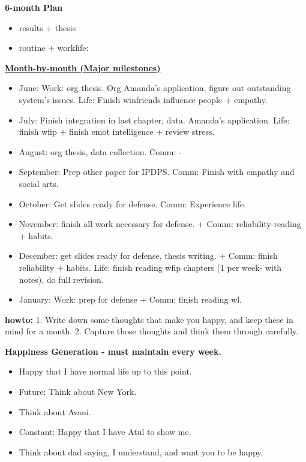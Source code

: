 \documentclass[11pt]{article}
\begin{document}
\textbf{6-month Plan} 
\begin{itemize} 
  \tiny \item \tiny results + thesis
\item \tiny routine + worklife:
\end{itemize}
\newpage
    {\small \underline{\textbf{Month-by-month (Major milestones)}}}\\ 
    \begin{itemize}
      \small \item \small June: Work: org thesis. Org Amanda's
      application, figure out outstanding system's issues. Life:
      Finish winfriends influence people + empathy. 
    \item \small July: Finish integration in last chapter,
      data. Amanda's application. Life: finish wfip + finish emot
      intelligence + review stress. 
    \item \small August: org thesis, data collection. Comm:  - 
    \item \small September: Prep other paper for IPDPS. Comm: Finish
      with empathy and social arts. 
    \item \small October: Get slides ready for defense. Comm: Experience life. 
    \item \small November: finish all work necessary for defense.  +
      Comm: reliability-reading + habits. 
    \item \small December: get slides ready for defense, thesis
      writing.  + Comm: finish reliability + habits.  Life:
      finish reading wfip chapters (1 per week- with notes), 
      do full revision. 
    \item \small January: Work: prep for defense  +  Comm: finish reading wl. 
    \end{itemize} 

\newpage 
\textbf{howto:} 1. Write down some thoughts that make you happy, and
keep these in mind for a month.  2. Capture those thoughts and think
them through carefully. 

\textbf{Happiness Generation - must maintain every week.}
\begin{itemize}
  \tiny \item \tiny Happy that I have normal life up to this point.
  \item \tiny Future: Think about New York. 
  \item \tiny Think about Avani. 
  \item \tiny Constant: Happy that I have Atul to show me.
  \item \tiny Think about dad saying, I understand, and want you to be happy. 
\end{itemize} 
\end{document}
